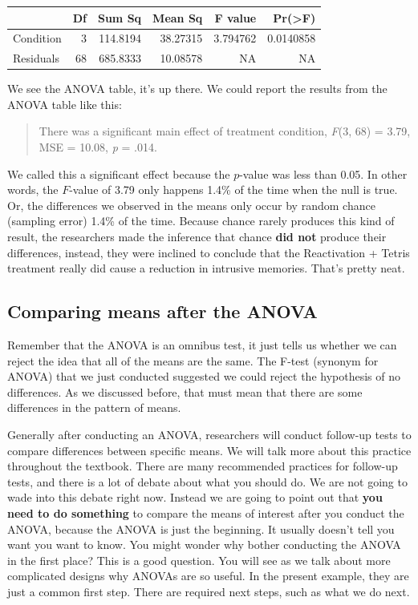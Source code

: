 \documentclass[
]{book}
\begin{document}
\begin{tabular}{l|r|r|r|r|r}
\hline
  & Df & Sum Sq & Mean Sq & F value & Pr(>F)\\
\hline
Condition & 3 & 114.8194 & 38.27315 & 3.794762 & 0.0140858\\
\hline
Residuals & 68 & 685.8333 & 10.08578 & NA & NA\\
\hline
\end{tabular}

We see the ANOVA table, it's up there. We could report the results from the ANOVA table like this:

\begin{quote}
There was a significant main effect of treatment condition, \emph{F}(3, 68) = 3.79, MSE = 10.08, \emph{p} = .014.
\end{quote}

We called this a significant effect because the \(p\)-value was less than 0.05. In other words, the \(F\)-value of 3.79 only happens 1.4\% of the time when the null is true. Or, the differences we observed in the means only occur by random chance (sampling error) 1.4\% of the time. Because chance rarely produces this kind of result, the researchers made the inference that chance \textbf{did not} produce their differences, instead, they were inclined to conclude that the Reactivation + Tetris treatment really did cause a reduction in intrusive memories. That's pretty neat.

\subsection{Comparing means after the ANOVA}\label{comparing-means-after-the-anova}

Remember that the ANOVA is an omnibus test, it just tells us whether we can reject the idea that all of the means are the same. The F-test (synonym for ANOVA) that we just conducted suggested we could reject the hypothesis of no differences. As we discussed before, that must mean that there are some differences in the pattern of means.

Generally after conducting an ANOVA, researchers will conduct follow-up tests to compare differences between specific means. We will talk more about this practice throughout the textbook. There are many recommended practices for follow-up tests, and there is a lot of debate about what you should do. We are not going to wade into this debate right now. Instead we are going to point out that \textbf{you need to do something} to compare the means of interest after you conduct the ANOVA, because the ANOVA is just the beginning. It usually doesn't tell you want you want to know. You might wonder why bother conducting the ANOVA in the first place? This is a good question. You will see as we talk about more complicated designs why ANOVAs are so useful. In the present example, they are just a common first step. There are required next steps, such as what we do next.
\end{document}
